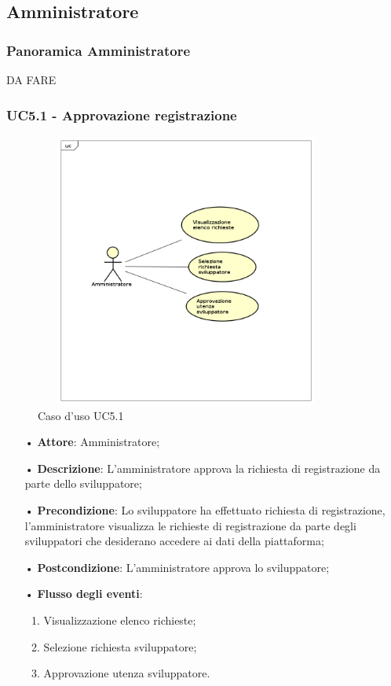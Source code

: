 \subsection{Amministratore}
\subsubsection{Panoramica Amministratore}
DA FARE
\subsubsection{UC5.1 - Approvazione registrazione}
\begin{figure}[H]
\centering
\includegraphics[width=10cm,height=9cm]{img/UC51.png} 
\caption{Caso d'uso UC5.1}
\end{figure}

\begin{itemize}
\item[•] \textbf{Attore}: Amministratore;

\item[•] \textbf{Descrizione}: L’amministratore approva la richiesta di registrazione da parte dello sviluppatore;

\item[•] \textbf{Precondizione}: Lo sviluppatore ha effettuato richiesta di registrazione, l'amministratore visualizza le richieste di registrazione da parte degli sviluppatori che desiderano accedere ai dati della piattaforma;

\item[•] \textbf{Postcondizione}: L’amministratore approva lo sviluppatore;

\item[•] \textbf{Flusso degli eventi}:

\begin{enumerate}

\item Visualizzazione elenco richieste;

\item Selezione richiesta sviluppatore;

\item Approvazione utenza sviluppatore.

\end{enumerate}

\end{itemize}



